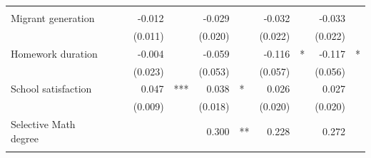 \documentclass{article}
\begin{document}
\begin{table}[!h]
\begin{tabular}{lllllllllll}
  \multicolumn{1}{l}{} \\
\multicolumn{1}{l}{Migrant generation} &
  \multicolumn{1}{r}{} &
  \multicolumn{1}{l}{} &
  \multicolumn{1}{r}{-0.012} &
  \multicolumn{1}{l}{} &
  \multicolumn{1}{r}{-0.029} &
  \multicolumn{1}{l}{} &
  \multicolumn{1}{r}{-0.032} &
  \multicolumn{1}{l}{} &
  \multicolumn{1}{r}{-0.033} &
  \multicolumn{1}{l}{} \\
\multicolumn{1}{l}{} &
  \multicolumn{1}{r}{} &
  \multicolumn{1}{l}{} &
  \multicolumn{1}{r}{(0.011)} &
  \multicolumn{1}{l}{} &
  \multicolumn{1}{r}{(0.020)} &
  \multicolumn{1}{l}{} &
  \multicolumn{1}{r}{(0.022)} &
  \multicolumn{1}{l}{} &
  \multicolumn{1}{r}{(0.022)} &
  \multicolumn{1}{l}{} \\
\multicolumn{1}{l}{Homework duration} &
  \multicolumn{1}{r}{} &
  \multicolumn{1}{l}{} &
  \multicolumn{1}{r}{-0.004} &
  \multicolumn{1}{l}{} &
  \multicolumn{1}{r}{-0.059} &
  \multicolumn{1}{l}{} &
  \multicolumn{1}{r}{-0.116} &
  \multicolumn{1}{l}{*} &
  \multicolumn{1}{r}{-0.117} &
  \multicolumn{1}{l}{*} \\
\multicolumn{1}{l}{} &
  \multicolumn{1}{r}{} &
  \multicolumn{1}{l}{} &
  \multicolumn{1}{r}{(0.023)} &
  \multicolumn{1}{l}{} &
  \multicolumn{1}{r}{(0.053)} &
  \multicolumn{1}{l}{} &
  \multicolumn{1}{r}{(0.057)} &
  \multicolumn{1}{l}{} &
  \multicolumn{1}{r}{(0.056)} &
  \multicolumn{1}{l}{} \\
\multicolumn{1}{l}{School satisfaction} &
  \multicolumn{1}{r}{} &
  \multicolumn{1}{l}{} &
  \multicolumn{1}{r}{0.047} &
  \multicolumn{1}{l}{***} &
  \multicolumn{1}{r}{0.038} &
  \multicolumn{1}{l}{*} &
  \multicolumn{1}{r}{0.026} &
  \multicolumn{1}{l}{} &
  \multicolumn{1}{r}{0.027} &
  \multicolumn{1}{l}{} \\
\multicolumn{1}{l}{} &
  \multicolumn{1}{r}{} &
  \multicolumn{1}{l}{} &
  \multicolumn{1}{r}{(0.009)} &
  \multicolumn{1}{l}{} &
  \multicolumn{1}{r}{(0.018)} &
  \multicolumn{1}{l}{} &
  \multicolumn{1}{r}{(0.020)} &
  \multicolumn{1}{l}{} &
  \multicolumn{1}{r}{(0.020)} &
  \multicolumn{1}{l}{} \\
\multicolumn{1}{l}{Selective Math degree} &
  \multicolumn{1}{r}{} &
  \multicolumn{1}{l}{} &
  \multicolumn{1}{r}{} &
  \multicolumn{1}{l}{} &
  \multicolumn{1}{r}{0.300} &
  \multicolumn{1}{l}{**} &
  \multicolumn{1}{r}{0.228} &
  \multicolumn{1}{l}{} &
  \multicolumn{1}{r}{0.272} &
  \multicolumn{1}{l}{} \\
\multicolumn{1}{l}{} &
  \multicolumn{1}{r}{} &
  \multicolumn{1}{l}{} &
  \multicolumn{1}{r}{} &

\end{tabular}
\end{table}
\end{document}
